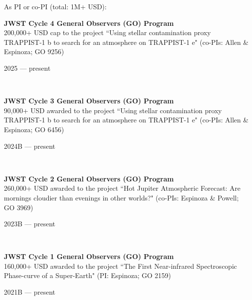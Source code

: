 \documentclass[12pt, a4paper]{article} %
\begin{document}
As PI or co-PI (total: 1M+ USD):\\

\begin{minipage}[t]{0.7\textwidth}
\begin{flushleft}%
  \setlength{\leftskip}{0.2cm}%
\textbf{JWST Cycle 4 General Observers (GO) Program}\\
200,000+ USD cap to the project ``Using stellar contamination proxy TRAPPIST-1 b to search for an atmosphere on TRAPPIST-1 e" (co-PIs: Allen \& Espinoza; GO 9256)
\end{flushleft}
\end{minipage}
\begin{minipage}[t]{0.3\textwidth}
\hfill 2025 --- present
\end{minipage}\\

\begin{minipage}[t]{0.7\textwidth}
\begin{flushleft}%
  \setlength{\leftskip}{0.2cm}%
\textbf{JWST Cycle 3 General Observers (GO) Program}\\
90,000+ USD awarded to the project ``Using stellar contamination proxy TRAPPIST-1 b to search for an atmosphere on TRAPPIST-1 e" (co-PIs: Allen \& Espinoza; GO 6456)
\end{flushleft}
\end{minipage}
\begin{minipage}[t]{0.3\textwidth}
\hfill 2024B --- present
\end{minipage}\\

\begin{minipage}[t]{0.7\textwidth}
\begin{flushleft}%
  \setlength{\leftskip}{0.2cm}%
\textbf{JWST Cycle 2 General Observers (GO) Program}\\
260,000+ USD awarded to the project ``Hot Jupiter Atmospheric Forecast: Are mornings cloudier than evenings in other worlds?" (co-PIs: Espinoza \& Powell; GO 3969)
\end{flushleft}
\end{minipage}
\begin{minipage}[t]{0.3\textwidth}
\hfill 2023B --- present
\end{minipage}\\

\begin{minipage}[t]{0.7\textwidth}
\begin{flushleft}%
  \setlength{\leftskip}{0.2cm}%
\textbf{JWST Cycle 1 General Observers (GO) Program}\\
160,000+ USD awarded to the project ``The First Near-infrared Spectroscopic Phase-curve of a Super-Earth" (PI: Espinoza; GO 2159)
\end{flushleft}
\end{minipage}
\begin{minipage}[t]{0.3\textwidth}
\hfill 2021B --- present
\end{minipage}\\
\end{document}
